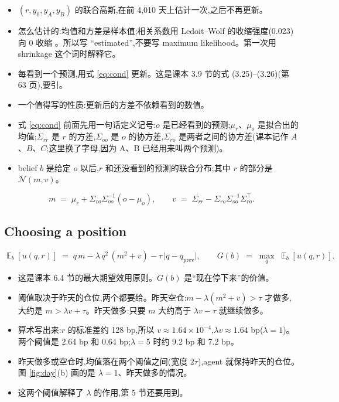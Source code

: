 \documentclass{article}
\newenvironment{pts}{\begin{itemize}[nosep,leftmargin=1.15em,topsep=1pt]}{\end{itemize}}
\newcommand{\qprev}{q_{\mathrm{prev}}}
\DeclareMathOperator{\E}{\mathbb{E}}
\begin{document}
\begin{note}[约 80 词]
\begin{pts}
\item $(r, y_0, y_A, y_B)$ 的联合高斯,在前 4{,}010 天上估计一次,之后不再更新。
\item 怎么估计的:均值和方差是样本值;相关系数用 Ledoit--Wolf 的收缩强度(0.023)向 0 收缩 \citep{ledoit2004wellconditioned}。所以写 ``estimated'',不要写 maximum likelihood。第一次用 shrinkage 这个词时解释它。
\item 每看到一个预测,用式 \eqref{eq:cond} 更新。这是课本 3.9 节的式 (3.25)--(3.26)(第 63 页),要引。
\item 一个值得写的性质:更新后的方差不依赖看到的数值。
\item 式 \eqref{eq:cond} 前面先用一句话定义记号:$o$ 是已经看到的预测;$\mu_r$、$\mu_o$ 是拟合出的均值;$\Sigma_{rr}$ 是 $r$ 的方差,$\Sigma_{oo}$ 是 $o$ 的协方差,$\Sigma_{ro}$ 是两者之间的协方差(课本记作 $A$、$B$、$C$;这里换了字母,因为 A、B 已经用来叫两个预测)。
\item belief $b$ 是给定 $o$ 以后,$r$ 和还没看到的预测的联合分布;其中 $r$ 的部分是 $\mathcal{N}(m, v)$。
\end{pts}
\end{note}

\begin{equation}
m \;=\; \mu_r + \Sigma_{ro} \Sigma_{oo}^{-1} (o - \mu_o), \qquad
v \;=\; \Sigma_{rr} - \Sigma_{ro} \Sigma_{oo}^{-1} \Sigma_{ro}^{\top}.
\label{eq:cond}
\end{equation}

\subsection{Choosing a position}

\begin{equation}
\E_b\!\left[u(q, r)\right] \;=\; q\,m - \lambda\,q^{2}\,(m^{2} + v) - \tau\,\lvert q - \qprev\rvert ,
\qquad
G(b) \;=\; \max_{q}\; \E_b\!\left[u(q, r)\right].
\label{eq:stop}
\end{equation}

\begin{note}[约 80 词]
\begin{pts}
\item 这是课本 6.4 节的最大期望效用原则。$G(b)$ 是``现在停下来''的价值。
\item 阈值取决于昨天的仓位,两个都要给。昨天空仓:$m - \lambda(m^{2}+v) > \tau$ 才做多,大约是 $m > \lambda v + \tau$。昨天做多:只要 $m$ 大约高于 $\lambda v - \tau$ 就继续做多。
\item 算术写出来:$r$ 的标准差约 128 bp,所以 $v \approx 1.64\times10^{-4}$,$\lambda v \approx 1.64$ bp($\lambda=1$)。两个阈值是 2.64 bp 和 0.64 bp;$\lambda=5$ 时约 9.2 bp 和 7.2 bp。
\item 昨天做多或空仓时,均值落在两个阈值之间(宽度 $2\tau$),agent 就保持昨天的仓位。图 \ref{fig:day}(b) 画的是 $\lambda=1$、昨天做多的情况。
\item 这两个阈值解释了 $\lambda$ 的作用,第 5 节还要用到。
\end{pts}
\end{note}
\end{document}

